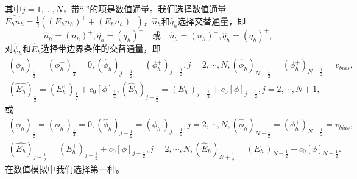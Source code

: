 其中$j = 1,...,N$，带“$\widehat{\ }$”的项是数值通量。我们选择数值通量$\widehat{E_h n_h} = \frac{1}{2}((E_hn_h)^+  + (E_hn_h)^-)$，$\hat{n}_h$和$\hat{q}_h$选择交替通量，即
\begin{equation}
	\hat{n}_h = (n_h)^+, \hat{q}_h = (q_h)^- \quad \text{或} \quad \hat{n}_h = (n_h)^-, \hat{q}_h = (q_h)^+, \label{numbericalFlux:n&q}
\end{equation}
对$\hat{\phi}_h$和$\hat{E}_h$选择带边界条件的交替通量，即
\begin{equation}
	\begin{aligned}
		(\hat{\phi}_h)_{\frac{1}{2}} = (\phi_h^-)_{\frac{1}{2}} = 0, (\hat{\phi}_h)_{j-\frac{1}{2}} = (\phi_h^+)_{j-\frac{1}{2}},j = 2,\cdots,N,(\hat{\phi}_h)_{N-\frac{1}{2}} = (\phi_h^+)_{N-\frac{1}{2}} = v_{bias}, \\
		(\hat{E_h})_{\frac{1}{2}} = (E_h^+)_{\frac{1}{2}} + c_0[\phi]_{\frac{1}{2}}, (\hat{E}_h)_{j-\frac{1}{2}} = (E_h^-)_{j-\frac{1}{2}} + c_0[\phi]_{j-\frac{1}{2}},j = 2,\cdots,N+1,
	\end{aligned}\label{numbericalFlux:phi&E}
\end{equation}
或
\begin{equation}
	\begin{aligned}
		(\hat{\phi}_h)_{\frac{1}{2}} = (\phi_h^-)_{\frac{1}{2}} = 0, (\hat{\phi}_h)_{j-\frac{1}{2}} = (\phi_h^-)_{j-\frac{1}{2}},j = 2,\cdots,N,(\hat{\phi}_h)_{N-\frac{1}{2}} = (\phi_h^+)_{N-\frac{1}{2}} = v_{bias}, \\
		(\hat{E_h})_{j - \frac{1}{2}} = (E_h^+)_{j - \frac{1}{2}} + c_0[\phi]_{j-\frac{1}{2}},j = 2,\cdots,N, (\hat{E}_h)_{N+\frac{1}{2}} = (E_h^-)_{N+\frac{1}{2}} + c_0[\phi]_{N+\frac{1}{2}}.
	\end{aligned}\label{numbericalFlux:phi&E:alt}
\end{equation}
在数值模拟中我们选择第一种。
